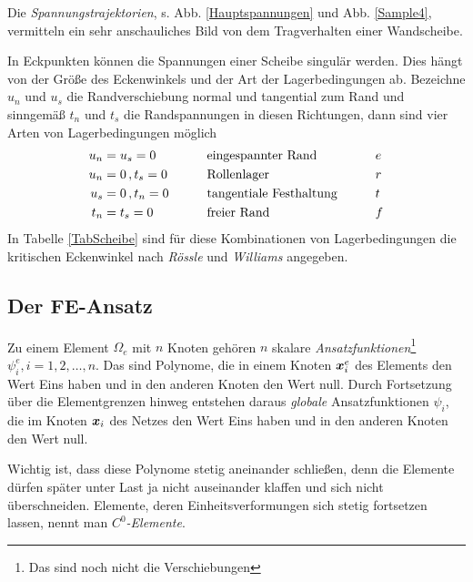{Die {\em Spannungstrajektorien}, s. Abb. \ref{Hauptspannungen} und Abb. \ref{Sample4}, vermitteln ein sehr anschauliches Bild von dem Tragverhalten einer Wandscheibe.

In Eckpunkten k\"{o}nnen die Spannungen einer Scheibe singul\"{a}r werden. Dies h\"{a}ngt von der Gr\"{o}{\ss}e des Eckenwinkels und der Art der Lagerbedingungen ab. Bezeichne $u_n$ und $u_s$ die Randverschiebung normal und tangential zum Rand und sinngem\"{a}{\ss} $t_n$ und $t_s$ die Randspannungen in diesen Richtungen, dann sind vier Arten von Lagerbedingungen m\"{o}glich
\begin{alignat}{3}
u_n &= u_s = 0 \qquad &&\mbox{eingespannter Rand} \qquad && e \nonumber\\
u_n &= 0\,, t_s = 0 \qquad &&\mbox{Rollenlager} \qquad && r \nonumber\\
u_s &= 0\,, t_n = 0 \qquad &&\mbox{tangentiale Festhaltung} \qquad && t\nonumber \\
t_n &= t_s = 0 \qquad &&\mbox{freier Rand} \qquad && f \nonumber
\end{alignat}
In Tabelle \ref{TabScheibe} sind f\"{u}r diese Kombinationen von Lagerbedingungen die kritischen Eckenwinkel nach {\em R\"{o}ssle\/} \cite{Roessle2} und {\em Williams\/} \cite{Williams} angegeben.


{\textcolor{sectionTitleBlue}{\section{Der FE-Ansatz}}}
Zu einem Element $\Omega_e$ mit $n$ Knoten geh\"{o}ren $n$ skalare {\em Ansatzfunktionen\/}\footnote{Das sind noch nicht die Verschiebungen} $\psi_i^e, i = 1,2,\ldots,n$. Das sind Polynome, die in einem Knoten $\mbox{\boldmath $x$}_i^e$ des Elements den Wert Eins haben und in den anderen Knoten den Wert null. Durch Fortsetzung \"{u}ber die Elementgrenzen hinweg entstehen daraus {\em globale\/} Ansatzfunktionen $\psi_i$, die im Knoten $\mbox{\boldmath $x$}_i$ des Netzes den Wert Eins haben und in den anderen Knoten den Wert null.

Wichtig ist, dass diese Polynome stetig aneinander schlie{\ss}en, denn die Elemente d\"{u}rfen sp\"{a}ter unter Last ja nicht auseinander klaffen und sich nicht \"{u}berschneiden. Elemente, deren Einheitsverformungen sich stetig fortsetzen lassen, nennt man {\em $C^0$-Elemente\/}.

}
